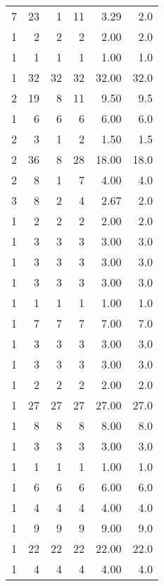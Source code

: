\begin{tabular}{rrrrrr}
         7 &          23 &    1 &   11 &   3.29 &      2.0 \\
         1 &           2 &    2 &    2 &   2.00 &      2.0 \\
         1 &           1 &    1 &    1 &   1.00 &      1.0 \\
         1 &          32 &   32 &   32 &  32.00 &     32.0 \\
         2 &          19 &    8 &   11 &   9.50 &      9.5 \\
         1 &           6 &    6 &    6 &   6.00 &      6.0 \\
         2 &           3 &    1 &    2 &   1.50 &      1.5 \\
         2 &          36 &    8 &   28 &  18.00 &     18.0 \\
         2 &           8 &    1 &    7 &   4.00 &      4.0 \\
         3 &           8 &    2 &    4 &   2.67 &      2.0 \\
         1 &           2 &    2 &    2 &   2.00 &      2.0 \\
         1 &           3 &    3 &    3 &   3.00 &      3.0 \\
         1 &           3 &    3 &    3 &   3.00 &      3.0 \\
         1 &           3 &    3 &    3 &   3.00 &      3.0 \\
         1 &           1 &    1 &    1 &   1.00 &      1.0 \\
         1 &           7 &    7 &    7 &   7.00 &      7.0 \\
         1 &           3 &    3 &    3 &   3.00 &      3.0 \\
         1 &           3 &    3 &    3 &   3.00 &      3.0 \\
         1 &           2 &    2 &    2 &   2.00 &      2.0 \\
         1 &          27 &   27 &   27 &  27.00 &     27.0 \\
         1 &           8 &    8 &    8 &   8.00 &      8.0 \\
         1 &           3 &    3 &    3 &   3.00 &      3.0 \\
         1 &           1 &    1 &    1 &   1.00 &      1.0 \\
         1 &           6 &    6 &    6 &   6.00 &      6.0 \\
         1 &           4 &    4 &    4 &   4.00 &      4.0 \\
         1 &           9 &    9 &    9 &   9.00 &      9.0 \\
         1 &          22 &   22 &   22 &  22.00 &     22.0 \\
         1 &           4 &    4 &    4 &   4.00 &      4.0 \\
\bottomrule
\end{tabular}

